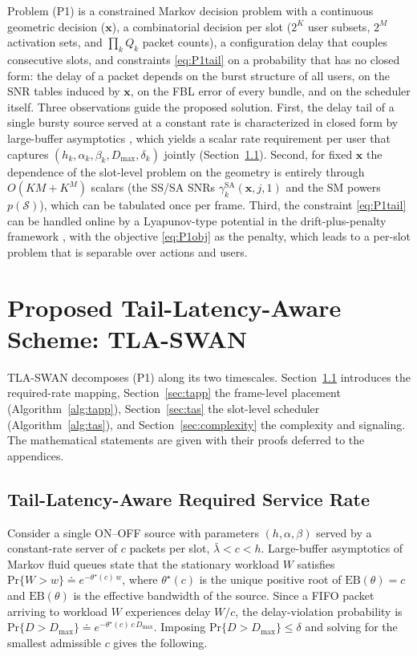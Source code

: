 \documentclass[journal]{IEEEtran}
\renewcommand{\Pr}{\mathrm{Pr}}
\newcommand{\Dmax}{D_{\max}}
\newcommand{\vect}[1]{\bm{#1}}
\newcommand{\Sset}{\mathcal{S}}
\begin{document}
Problem (P1) is a constrained Markov decision problem with a continuous geometric decision ($\vect x$), a combinatorial decision per slot ($2^K$ user subsets, $2^M$ activation sets, and $\prod_k Q_k$ packet counts), a configuration delay that couples consecutive slots, and constraints \eqref{eq:P1tail} on a probability that has no closed form: the delay of a packet depends on the burst structure of all users, on the SNR tables induced by $\vect x$, on the FBL error of every bundle, and on the scheduler itself. Three observations guide the proposed solution. First, the delay tail of a single bursty source served at a constant rate is characterized in closed form by large-buffer asymptotics \cite{Anick1982,Chang1994}, which yields a scalar rate requirement per user that captures $(h_k,\alpha_k,\beta_k,\Dmax,\delta_k)$ jointly (Section~\ref{sec:creq}). Second, for fixed $\vect x$ the dependence of the slot-level problem on the geometry is entirely through $O(KM+K^M)$ scalars (the SS/SA SNRs $\gamma_k^{\mathrm{SA}}(\vect x,j,1)$ and the SM powers $p(\Sset)$), which can be tabulated once per frame. Third, the constraint \eqref{eq:P1tail} can be handled online by a Lyapunov-type potential in the drift-plus-penalty framework \cite{Neely2010}, with the objective \eqref{eq:P1obj} as the penalty, which leads to a per-slot problem that is separable over actions and users.

\section{Proposed Tail-Latency-Aware Scheme: TLA-SWAN}\label{sec:scheme}


TLA-SWAN decomposes (P1) along its two timescales. Section~\ref{sec:creq} introduces the required-rate mapping, Section~\ref{sec:tapp} the frame-level placement (Algorithm~\ref{alg:tapp}), Section~\ref{sec:tas} the slot-level scheduler (Algorithm~\ref{alg:tas}), and Section~\ref{sec:complexity} the complexity and signaling. The mathematical statements are given with their proofs deferred to the appendices.

\subsection{Tail-Latency-Aware Required Service Rate}\label{sec:creq}
Consider a single ON--OFF source with parameters $(h,\alpha,\beta)$ served by a constant-rate server of $c$ packets per slot, $\bar\lambda<c<h$. Large-buffer asymptotics of Markov fluid queues \cite{Anick1982,Elwalid1993,Chang1994} state that the stationary workload $W$ satisfies $\Pr\{W>w\}\doteq e^{-\theta^\star(c)\,w}$, where $\theta^\star(c)$ is the unique positive root of $\mathrm{EB}(\theta)=c$ and $\mathrm{EB}(\theta)$ is the effective bandwidth of the source. Since a FIFO packet arriving to workload $W$ experiences delay $W/c$, the delay-violation probability is $\Pr\{D>\Dmax\}\doteq e^{-\theta^\star(c)\,c\,\Dmax}$. Imposing $\Pr\{D>\Dmax\}\le\delta$ and solving for the smallest admissible $c$ gives the following.
\end{document}
